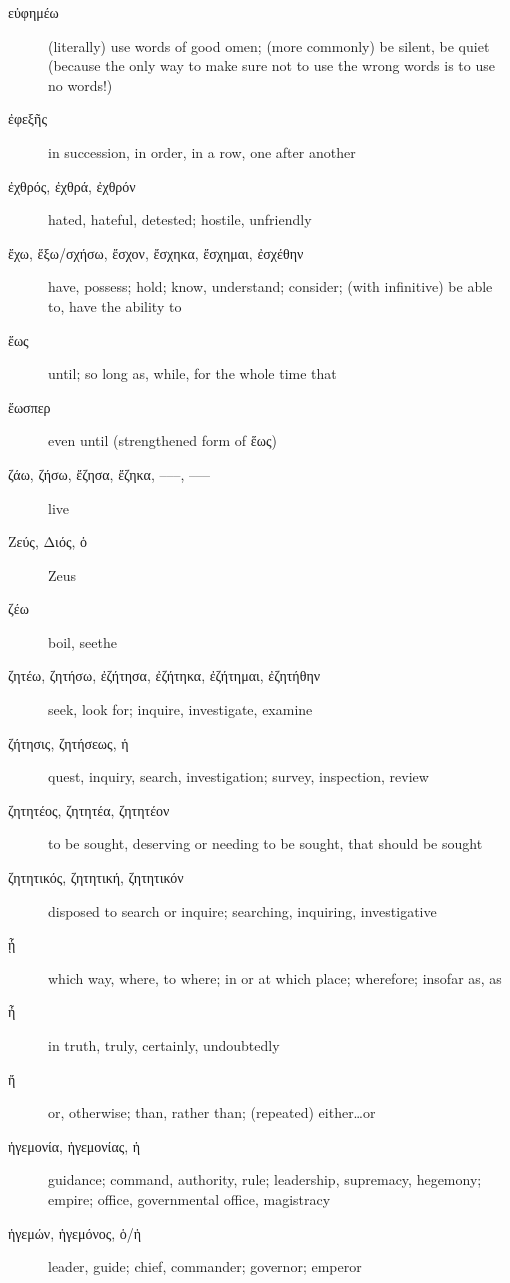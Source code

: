 \documentclass[12pt,letterpaper]{article}
\begin{document}
\begin{description}
    \item[\textgreek{εὐφημέω}] (literally) use words of good omen; (more commonly) be silent, be quiet (because the only way to make sure not to use the wrong words is to use no words!)
    \item[\textgreek{ἐφεξῆς}] in succession, in order, in a row, one after another
    \item[\textgreek{ἐχθρός, ἐχθρά, ἐχθρόν}] \marginnote{*}hated, hateful, detested; hostile, unfriendly
    \item[\textgreek{ἔχω, ἕξω/σχήσω, ἔσχον, ἔσχηκα, ἔσχημαι, ἐσχέθην}] \marginnote{*}have, possess; hold; know, understand; consider; (with infinitive) be able to, have the ability to
    \item[\textgreek{ἕως}] \marginnote{*}until; so long as, while, for the whole time that
    \item[\textgreek{ἕωσπερ}] even until (strengthened form of \textgreek{ἕως})
    \item[\textgreek{ζάω, ζήσω, ἔζησα, ἔζηκα, –––, –––}] \marginnote{*}live
    \item[\textgreek{Ζεύς, Διός, ὁ}] Zeus
    \item[\textgreek{ζέω}] boil, seethe
    \item[\textgreek{ζητέω, ζητήσω, ἐζήτησα, ἐζήτηκα, ἐζήτημαι, ἐζητήθην}] \marginnote{*}seek, look for; inquire, investigate, examine
    \item[\textgreek{ζήτησις, ζητήσεως, ἡ}] quest, inquiry, search, investigation; survey, inspection, review
    \item[\textgreek{ζητητέος, ζητητέα, ζητητέον}] to be sought, deserving or needing to be sought, that should be sought
    \item[\textgreek{ζητητικός, ζητητική, ζητητικόν}] disposed to search or inquire; searching, inquiring, investigative
    \item[\textgreek{ᾗ}] which way, where, to where; in or at which place; wherefore; insofar as, as
    \item[\textgreek{ἦ}] in truth, truly, certainly, undoubtedly
    \item[\textgreek{ἤ}] \marginnote{*}or, otherwise; than, rather than; (repeated) either\dots or
    \item[\textgreek{ἡγεμονία, ἡγεμονίας, ἡ}] guidance; command, authority, rule; leadership, supremacy, hegemony; empire; office, governmental office, magistracy
    \item[\textgreek{ἡγεμών, ἡγεμόνος, ὁ/ἡ}] leader, guide; chief, commander; governor; emperor

\end{description}
\end{document}
